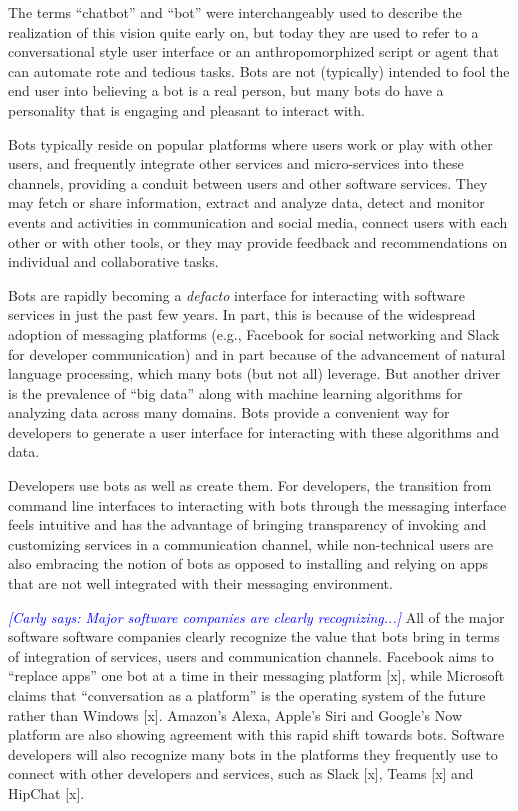 \documentclass{sig-alternate}
\newcommand{\cl}[1]{\textcolor{blue}{{\it [Carly says: #1]}}}
\begin{document}
The terms ``chatbot'' and ``bot'' were interchangeably used to describe the realization of this vision quite early on, but today they are used to refer to a conversational style user interface or an anthropomorphized script or agent that can automate rote and tedious tasks.
Bots are not (typically) intended to fool the end user into believing a bot is a real person, but many bots do have a personality that is engaging and pleasant to interact with. 
 
Bots typically reside on popular platforms where users work or play with other users, and frequently integrate other services and micro-services into these channels, providing a conduit between users and other software services. 
They may fetch or share information, extract and analyze data, detect and monitor events and activities in communication and social media, connect users with each other or with other tools, or they may provide feedback and recommendations on individual and collaborative tasks. 

Bots are rapidly becoming a \emph{defacto} interface for interacting with software services in just the past few years.  In part, this is because of the widespread adoption of messaging platforms (e.g., Facebook for social networking and Slack for developer communication) and in part because of the advancement of natural language processing, which many bots (but not all) leverage.
But another driver is the prevalence of ``big data'' along with machine learning algorithms for analyzing data across many domains.  Bots provide a convenient way for developers to generate a user interface for interacting with these algorithms and data. 

Developers use bots as well as create them. For developers, the transition from command line interfaces to interacting with bots through the messaging interface feels intuitive and has the advantage of bringing transparency of invoking and customizing services in a communication channel, while non-technical users are also embracing the notion of bots as opposed to installing and relying on apps that are not well integrated with their messaging environment.  

\cl{Major software companies are clearly recognizing...}
All of the major software software companies clearly recognize the value that bots bring in terms of integration of services, users and communication channels. Facebook aims to ``replace apps'' one bot at a time in their messaging platform [x], while Microsoft claims that ``conversation as a platform'' is the operating system of the future rather than Windows [x]. 
Amazon's Alexa, Apple's Siri and Google's Now platform are also showing agreement with this rapid shift towards bots.
Software developers will also recognize many bots in the platforms they frequently use to connect with other developers and services, such as Slack [x], Teams [x] and HipChat [x]. 
\end{document}

